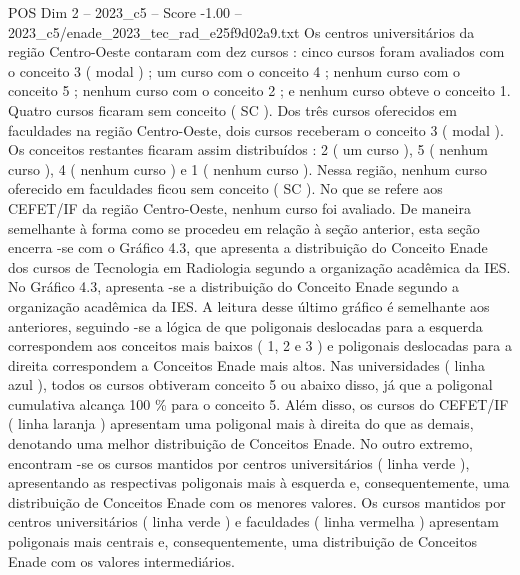 \begin{textsample}{POS Dim 2 – 2023\_c5 – Score -1.00 – 2023\_c5/enade\_2023\_tec\_rad\_e25f9d02a9.txt}
Os centros universitários da região Centro-Oeste contaram com dez cursos : cinco cursos foram avaliados com o conceito 3 ( modal ) ; um curso com o conceito 4 ; nenhum curso com o conceito 5 ; nenhum curso com o conceito 2 ; e nenhum curso obteve o conceito 1.
Quatro cursos ficaram sem conceito ( SC ).
Dos três cursos oferecidos em faculdades na região Centro-Oeste, dois cursos receberam o conceito 3 ( modal ).
Os conceitos restantes ficaram assim distribuídos : 2 ( um curso ), 5 ( nenhum curso ), 4 ( nenhum curso ) e 1 ( nenhum curso ).
Nessa região, nenhum curso oferecido em faculdades ficou sem conceito ( SC ).
No que se refere aos CEFET/IF da região Centro-Oeste, nenhum curso foi avaliado.
De maneira semelhante à forma como se procedeu em relação à seção anterior, esta seção encerra -se com o Gráfico 4.3, que apresenta a distribuição do Conceito Enade dos cursos de Tecnologia em Radiologia segundo a organização acadêmica da IES.
No Gráfico 4.3, apresenta -se a distribuição do Conceito Enade segundo a organização acadêmica da IES.
A leitura desse último gráfico é semelhante aos anteriores, seguindo -se a lógica de que poligonais deslocadas para a esquerda correspondem aos conceitos mais baixos ( 1, 2 e 3 ) e poligonais deslocadas para a direita correspondem a Conceitos Enade mais altos.
Nas universidades ( linha azul ), todos os cursos obtiveram conceito 5 ou abaixo disso, já que a poligonal cumulativa alcança 100 \% para o conceito 5.
Além disso, os cursos do CEFET/IF ( linha laranja ) apresentam uma poligonal mais à direita do que as demais, denotando uma melhor distribuição de Conceitos Enade.
No outro extremo, encontram -se os cursos mantidos por centros universitários ( linha verde ), apresentando as respectivas poligonais mais à esquerda e, consequentemente, uma distribuição de Conceitos Enade com os menores valores.
Os cursos mantidos por centros universitários ( linha verde ) e faculdades ( linha vermelha ) apresentam poligonais mais centrais e, consequentemente, uma distribuição de Conceitos Enade com os valores intermediários.

\end{textsample}
